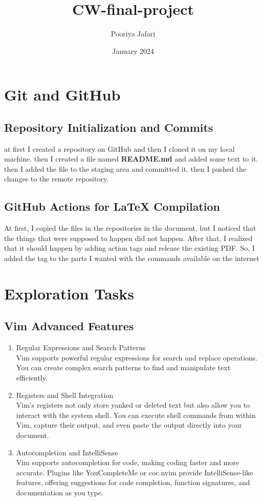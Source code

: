 \documentclass[titlepage]{article}
\title{CW-final-project}
\author{Pooriya Jafari}
\date{January 2024}
\begin{document}
\maketitle
\tableofcontents

\newpage

\section{Git and GitHub}
\subsection{Repository Initialization and Commits}
at first I created a repository on GitHub and then I cloned it on my local machine. then I created a file named \textbf{README.md} and added some text to it. then I added the file to the staging area and committed it. then I pushed the changes to the remote repository.

\subsection{GitHub Actions for LaTeX Compilation}
At first, I copied the files in the repositories in the document, but I noticed that the things that were supposed to happen did not happen. After that, I realized that it should happen by adding action tags and release the existing PDF. So, I added the tag to the parts I wanted with the commands available on the internet


\newpage

\section{Exploration Tasks}
\subsection{Vim Advanced Features}
\begin{enumerate}
    \item Regular Expressions and Search Patterns\\
    Vim supports powerful regular expressions for search and replace operations. You can create complex search patterns to find and manipulate text efficiently.

    \item Registers and Shell Integration\\
    Vim's registers not only store yanked or deleted text but also allow you to interact with the system shell. You can execute shell commands from within Vim, capture their output, and even paste the output directly into your document.

    \item Autocompletion and IntelliSense\\
    Vim supports autocompletion for code, making coding faster and more accurate. Plugins like YouCompleteMe or coc.nvim provide IntelliSense-like features, offering suggestions for code completion, function signatures, and documentation as you type.
\end{enumerate}
\end{document}
